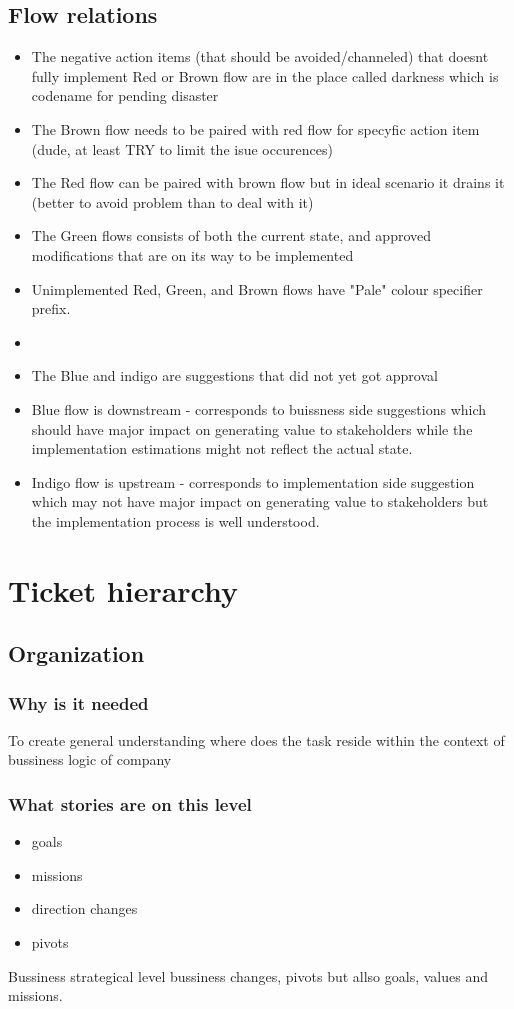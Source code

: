 \subsection{Flow relations}
\begin{itemize}
  \item The negative action items (that should be avoided/channeled) that doesnt fully implement 
  Red or Brown flow are in the place called darkness which is codename for pending disaster
  \item The Brown flow needs to be paired with red flow for specyfic action item (dude, at least TRY to limit the isue occurences)
  \item The Red flow can be paired with brown flow but in ideal scenario it drains it (better to avoid problem than to deal with it)
  \item The Green flows consists of both the current state, and approved modifications that are on its way to be implemented
  \item Unimplemented Red, Green, and Brown flows have "Pale" colour specifier prefix.
  \item 
  \item The Blue and indigo are suggestions that did not yet got approval
  \item Blue flow is downstream - corresponds to buissness side suggestions which should have major impact on generating value to stakeholders while the implementation estimations might not reflect the actual state.
  \item Indigo flow is upstream - corresponds to implementation side suggestion which may not have major impact on generating value to stakeholders but the implementation process is well understood.
\end{itemize}
\newpage
\section{Ticket hierarchy}
\subsection{Organization}
\subsubsection{Why is it needed}
To create general understanding  where does the task reside within the context of bussiness logic of company
\subsubsection{What stories are on this level}
\begin{itemize}
    \item goals
    \item missions
    \item direction changes
    \item pivots
\end{itemize}
Bussiness strategical level bussiness changes, pivots but allso goals, values and missions.
